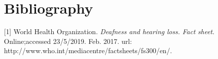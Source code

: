 
\chapter{Bibliography} %

\label{AppendixB} %

[1] World Health Organization. \textit{Deafness and hearing loss. Fact sheet}. Online;accessed 23/5/2019. Feb. 2017. url: http://www.who.int/mediacentre/factsheets/fs300/en/.